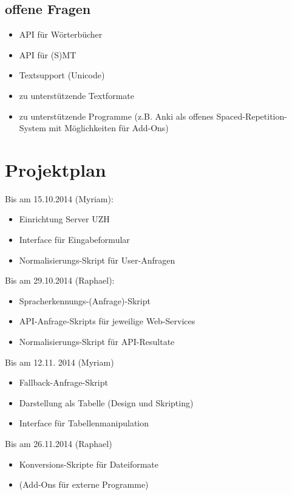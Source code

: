 \documentclass[a4paper]{article}
\begin{document}
\subsection{offene Fragen}

\begin{itemize}
	\item API für Wörterbücher
	\item API für (S)MT
	\item Textsupport (Unicode)
	\item zu unterstützende Textformate
	\item zu unterstützende Programme (z.B. Anki als offenes Spaced-Repetition-System mit Möglichkeiten für Add-Ons)
\end{itemize}

\section{Projektplan}

Bis am 15.10.2014 (Myriam):

\begin{itemize}
	\item Einrichtung Server UZH
	\item Interface für Eingabeformular
	\item Normalisierungs-Skript für User-Anfragen
\end{itemize}

Bis am 29.10.2014 (Raphael):
\begin{itemize}
	\item Spracherkennungs-(Anfrage)-Skript
	\item API-Anfrage-Skripts für jeweilige Web-Services
	\item Normalisierungs-Skript für API-Resultate
\end{itemize}

Bis am 12.11. 2014 (Myriam)
\begin{itemize}
	\item Fallback-Anfrage-Skript
	\item Darstellung als Tabelle (Design und Skripting)
	\item Interface für Tabellenmanipulation
\end{itemize}

Bis am 26.11.2014 (Raphael)
\begin{itemize}	
	\item Konversions-Skripte für Dateiformate
	\item (Add-Ons für externe Programme)
\end{itemize}
\end{document}
